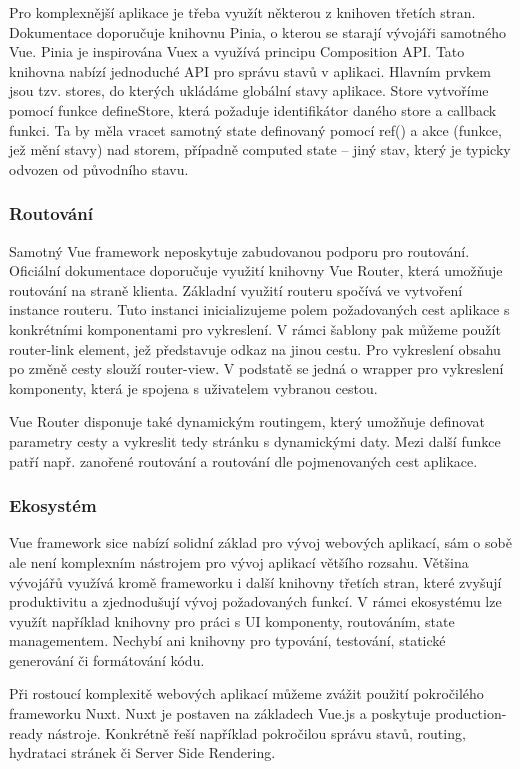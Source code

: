 Pro komplexnější aplikace je třeba využít některou z knihoven třetích stran. Dokumentace doporučuje knihovnu Pinia, o kterou se starají vývojáři samotného Vue. 
Pinia je inspirována Vuex a využívá principu Composition API. Tato knihovna nabízí jednoduché API pro správu stavů v aplikaci. 
Hlavním prvkem jsou tzv. stores, do kterých ukládáme globální stavy aplikace. 
Store vytvoříme pomocí funkce defineStore, která požaduje identifikátor daného store a callback funkci. 
Ta by měla vracet samotný state definovaný pomocí ref() a akce (funkce, jež mění stavy) nad storem, případně computed state -- jiný stav, který je typicky odvozen od původního stavu.\cite{pinia,vue}

\subsubsection{Routování}

Samotný Vue framework neposkytuje zabudovanou podporu pro routování. Oficiální dokumentace doporučuje využití knihovny Vue Router, která umožňuje routování na straně klienta. 
Základní využití routeru spočívá ve vytvoření instance routeru. Tuto instanci inicializujeme polem požadovaných cest aplikace s konkrétními komponentami pro vykreslení. 
V rámci šablony pak můžeme použít router-link element, jež představuje odkaz na jinou cestu. Pro vykreslení obsahu po změně cesty slouží router-view. 
V podstatě se jedná o wrapper pro vykreslení komponenty, která je spojena s uživatelem vybranou cestou.

Vue Router disponuje také dynamickým routingem, který umožňuje definovat parametry cesty a vykreslit tedy stránku s dynamickými daty. 
Mezi další funkce patří např. zanořené routování a routování dle pojmenovaných cest aplikace.\cite{vue,vuerouter}

\subsubsection{Ekosystém}

Vue framework sice nabízí solidní základ pro vývoj webových aplikací, sám o sobě ale není komplexním nástrojem pro vývoj aplikací většího rozsahu. 
Většina vývojářů využívá kromě frameworku i další knihovny třetích stran, které zvyšují produktivitu a zjednodušují vývoj požadovaných funkcí. 
V rámci ekosystému lze využít například knihovny pro práci s UI komponenty, routováním, state managementem. 
Nechybí ani knihovny pro typování, testování, statické generování či formátování kódu.

Při rostoucí komplexitě webových aplikací můžeme zvážit použití pokročilého frameworku Nuxt. Nuxt je postaven na základech Vue.js a poskytuje production-ready nástroje. 
Konkrétně řeší například pokročilou správu stavů, routing, hydrataci stránek či Server Side Rendering.\cite{awesomevue,vue}